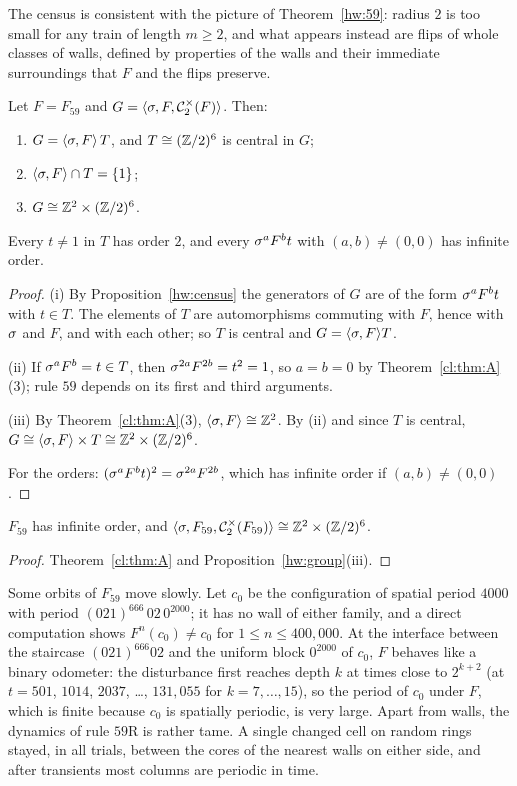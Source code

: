 The census is consistent with the picture of Theorem~\ref{hw:59}: radius $2$ is too small for any train of length $m\ge2$, and what appears instead are flips of whole classes of walls, defined by properties of the walls and their immediate surroundings that $F$ and the flips preserve.

\begin{proposition}\label{hw:group}
Let $F=F_{59}$ and $G=\langle\sigma,F,\mathcal{C}^{\times}_2(F)\rangle$. Then:
\begin{enumerate}
\item[(i)] $G=\langle\sigma,F\rangle\,T$, and $T\cong(\mathbb{Z}/2)^6$ is central in $G$;
\item[(ii)] $\langle\sigma,F\rangle\cap T=\{1\}$;
\item[(iii)] $G\cong\mathbb{Z}^2\times(\mathbb{Z}/2)^6$.
\end{enumerate}
Every $t\ne1$ in $T$ has order $2$, and every $\sigma^aF^bt$ with $(a,b)\ne(0,0)$ has infinite order.
\end{proposition}

\begin{proof}
(i) By Proposition~\ref{hw:census} the generators of $G$ are of the form $\sigma^aF^bt$ with $t\in T$. The elements of $T$ are automorphisms commuting with $F$, hence with $\sigma$ and $F$, and with each other; so $T$ is central and $G=\langle\sigma,F\rangle T$.

(ii) If $\sigma^aF^b=t\in T$, then $\sigma^{2a}F^{2b}=t^2=1$, so $a=b=0$ by Theorem~\ref{cl:thm:A}(3); rule $59$ depends on its first and third arguments.

(iii) By Theorem~\ref{cl:thm:A}(3), $\langle\sigma,F\rangle\cong\mathbb{Z}^2$. By (ii) and since $T$ is central, $G\cong\langle\sigma,F\rangle\times T\cong\mathbb{Z}^2\times(\mathbb{Z}/2)^6$.

For the orders: $(\sigma^aF^bt)^2=\sigma^{2a}F^{2b}$, which has infinite order if $(a,b)\ne(0,0)$.
\end{proof}

\begin{corollary}\label{hw:order}
$F_{59}$ has infinite order, and $\langle\sigma,F_{59},\mathcal{C}^{\times}_2(F_{59})\rangle\cong\mathbb{Z}^2\times(\mathbb{Z}/2)^6$.
\end{corollary}

\begin{proof}
Theorem~\ref{cl:thm:A} and Proposition~\ref{hw:group}(iii).
\end{proof}

Some orbits of $F_{59}$ move slowly. Let $c_0$ be the configuration of spatial period $4000$ with period $(021)^{666}\,02\,0^{2000}$; it has no wall of either family, and a direct computation shows $F^n(c_0)\ne c_0$ for $1\le n\le400{,}000$. At the interface between the staircase $(021)^{666}02$ and the uniform block $0^{2000}$ of $c_0$, $F$ behaves like a binary odometer: the disturbance first reaches depth $k$ at times close to $2^{k+2}$ (at $t=501$, $1014$, $2037$, \dots, $131{,}055$ for $k=7,\dots,15$), so the period of $c_0$ under $F$, which is finite because $c_0$ is spatially periodic, is very large. Apart from walls, the dynamics of rule $59$R is rather tame. A single changed cell on random rings stayed, in all trials, between the cores of the nearest walls on either side, and after transients most columns are periodic in time.

